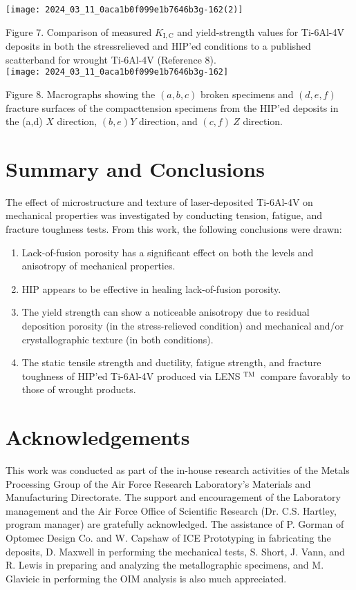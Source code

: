 \documentclass[10pt]{article}
\begin{document}
\begin{center}
\texttt{[image: 2024\_03\_11\_0aca1b0f099e1b7646b3g-162(2)]}
\end{center}

Figure 7. Comparison of measured $K_{\mathrm{I}, \mathrm{C}}$ and yield-strength values for Ti-6Al-4V deposits in both the stressrelieved and HIP'ed conditions to a published scatterband for wrought Ti-6Al-4V (Reference 8).\\
\texttt{[image: 2024\_03\_11\_0aca1b0f099e1b7646b3g-162]}

Figure 8. Macrographs showing the $(a, b, c)$ broken specimens and $(d, e, f)$ fracture surfaces of the compacttension specimens from the HIP'ed deposits in the (a,d) $X$ direction, $(b, e) Y$ direction, and $(c, f) ~ Z$ direction.

\section*{Summary and Conclusions}
The effect of microstructure and texture of laser-deposited Ti-6Al-4V on mechanical properties was investigated by conducting tension, fatigue, and fracture toughness tests. From this work, the following conclusions were drawn:

\begin{enumerate}
  \item Lack-of-fusion porosity has a significant effect on both the levels and anisotropy of mechanical properties.

  \item HIP appears to be effective in healing lack-of-fusion porosity.

  \item The yield strength can show a noticeable anisotropy due to residual deposition porosity (in the stress-relieved condition) and mechanical and/or crystallographic texture (in both conditions).

  \item The static tensile strength and ductility, fatigue strength, and fracture toughness of HIP'ed Ti-6Al-4V produced via LENS ${ }^{\text {TM }}$ compare favorably to those of wrought products.

\end{enumerate}

\section*{Acknowledgements}
This work was conducted as part of the in-house research activities of the Metals Processing Group of the Air Force Research Laboratory's Materials and Manufacturing Directorate. The support and encouragement of the Laboratory management and the Air Force Office of Scientific Research (Dr. C.S. Hartley, program manager) are gratefully acknowledged. The assistance of P. Gorman of Optomec Design Co. and W. Capshaw of ICE Prototyping in fabricating the deposits, D. Maxwell in performing the mechanical tests, S. Short, J. Vann, and R. Lewis in preparing and analyzing the metallographic specimens, and M. Glavicic in performing the OIM analysis is also much appreciated.
\end{document}

